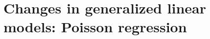 \documentclass[article]{jss}\usepackage[]{graphicx}\usepackage[]{xcolor}
\begin{document}

\section{Changes in generalized linear models: Poisson regression} \label{sec:poisson}
\end{document}
